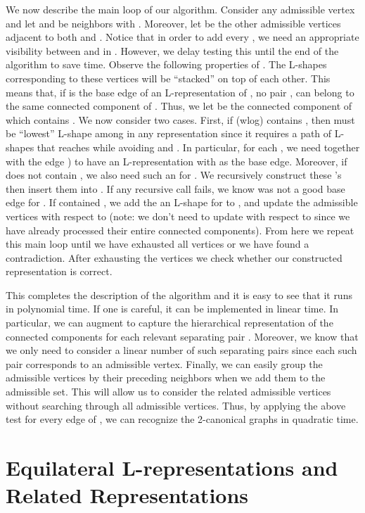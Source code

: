 \documentclass{llncs}
\begin{document}
We now describe the main loop of our algorithm. Consider any admissible vertex  and let  and  be  neighbors with . Moreover, let  be the other admissible vertices adjacent to both  and . Notice that in order to add every , we need an appropriate visibility between  and  in . However, we delay testing this until the end of the algorithm to save time. Observe the following properties of . The L-shapes corresponding to these vertices will be ``stacked'' on top of each other. This means that, if  is the base edge of an L-representation of , no pair ,  can belong to the same connected component of . Thus, we let  be the connected component of  which contains . We now consider two cases. First, if (wlog)  contains , then  must be ``lowest'' L-shape among  in any representation since it requires a path of L-shapes that reaches  while avoiding  and . 
In particular, for each ,  we need  together with the edge ) to have an L-representation  with  as the base edge. Moreover, if  does not contain , we also need such an  for . We recursively construct these 's then insert them into . 
If any recursive call fails, we know  was not a good base edge for . If  contained , we add the an L-shape for  to , and update the admissible vertices with respect to  (note: we don't need to update with respect to  since we have already processed their entire connected components). From here we repeat this main loop until we have exhausted all vertices or we have found a contradiction. After exhausting the vertices we check whether our constructed representation is correct. 

This completes the description of the algorithm and it is easy to see that it runs in polynomial time.
If one is careful, it can be implemented in linear time. In particular, we can augment  to capture the hierarchical representation of the connected components for each relevant separating pair . Moreover, we know that we only need to consider a linear number of such separating pairs since each such pair corresponds to an admissible vertex. Finally, we can easily group the admissible vertices by their preceding neighbors when we add them to the admissible set. This will allow us to consider the related admissible vertices without searching through all admissible vertices. 
Thus, by applying the above test for every edge of , we can recognize the 2-canonical graphs in quadratic time. 

\section{Equilateral L-representations and Related Representations}\label{sec:equilateral}
\end{document}
